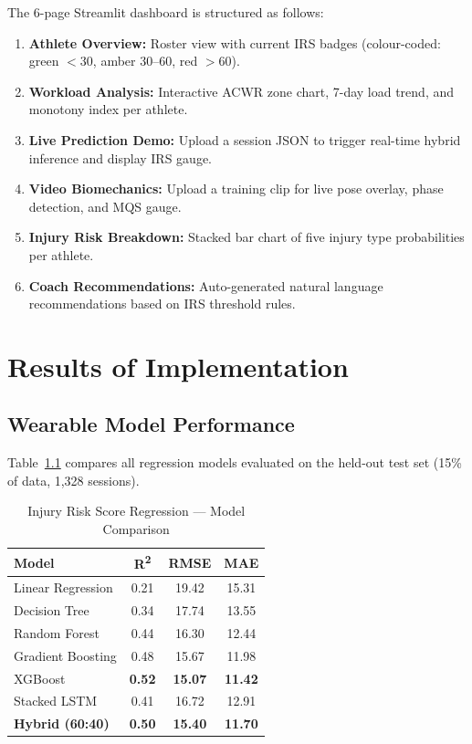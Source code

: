 \documentclass[12pt,a4paper]{report}
\begin{document}
The 6-page Streamlit dashboard is structured as follows:
\begin{enumerate}
  \item \textbf{Athlete Overview:} Roster view with current IRS badges (colour-coded: green $<$30, amber 30--60, red $>$60).
  \item \textbf{Workload Analysis:} Interactive ACWR zone chart, 7-day load trend, and monotony index per athlete.
  \item \textbf{Live Prediction Demo:} Upload a session JSON to trigger real-time hybrid inference and display IRS gauge.
  \item \textbf{Video Biomechanics:} Upload a training clip for live pose overlay, phase detection, and MQS gauge.
  \item \textbf{Injury Risk Breakdown:} Stacked bar chart of five injury type probabilities per athlete.
  \item \textbf{Coach Recommendations:} Auto-generated natural language recommendations based on IRS threshold rules.
\end{enumerate}

\clearpage

\chapter{Results of Implementation}

\section{Wearable Model Performance}

Table~\ref{tab:model_results} compares all regression models evaluated on the held-out test set (15\% of data, 1,328 sessions).

\begin{table}[h!]
  \centering
  \caption{Injury Risk Score Regression — Model Comparison}
  \label{tab:model_results}
  \vspace*{5pt}
  \begin{tabular}{|l|c|c|c|}
    \hline
    \textbf{Model} & \textbf{R\textsuperscript{2}} & \textbf{RMSE} & \textbf{MAE} \\ \hline
    Linear Regression         & 0.21 & 19.42 & 15.31 \\ \hline
    Decision Tree             & 0.34 & 17.74 & 13.55 \\ \hline
    Random Forest             & 0.44 & 16.30 & 12.44 \\ \hline
    Gradient Boosting         & 0.48 & 15.67 & 11.98 \\ \hline
    XGBoost                   & \textbf{0.52} & \textbf{15.07} & \textbf{11.42} \\ \hline
    Stacked LSTM              & 0.41 & 16.72 & 12.91 \\ \hline
    \textbf{Hybrid (60:40)}   & \textbf{0.50} & \textbf{15.40} & \textbf{11.70} \\ \hline
  \end{tabular}
\end{table}
\end{document}
